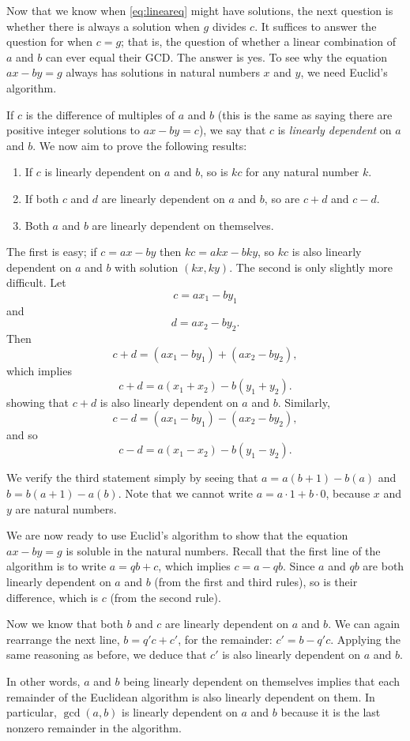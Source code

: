 \documentclass[a4paper,10pt]{article}
\begin{document}
Now that we know when \eqref{eq:lineareq} might have solutions, the next question is whether
there is always a solution when $g$ divides $c$. It suffices to answer the question for when $c=g$; that is, the question of whether a linear combination of $a$ and $b$
can ever equal their GCD. The answer is yes. To see why the equation $ax-by=g$ always has solutions
in natural numbers $x$ and $y$, we need Euclid's algorithm.

If $c$ is the difference of multiples of $a$ and $b$ (this is the same
as saying there are positive integer solutions to $ax-by=c$), we say that $c$
is \emph{linearly dependent} on $a$ and $b$. We now aim to prove the following results:
\begin{enumerate}
\item If $c$ is linearly dependent on $a$ and $b$, so is $kc$ for any natural number $k$.
\item If both $c$ and $d$ are linearly dependent on $a$ and $b$, so are $c+d$ and $c-d$.
\item Both $a$ and $b$ are linearly dependent on themselves.
\end{enumerate}
The first is easy; if $c=ax-by$ then $kc=akx-bky$, so $kc$ is also linearly dependent
on $a$ and $b$ with solution $(kx,ky)$. The second is only slightly more difficult. 
Let \[c=ax_1-by_1\] and \[d=ax_2-by_2.\] Then \[c+ d=(ax_1-by_1)+ (ax_2-by_2),\]
which implies \[c+d=a(x_1+x_2)-b(y_1+y_2).\] showing that $c+d$ is also linearly dependent
on $a$ and $b$. Similarly, \[c-d=(ax_1-by_1)-(ax_2-by_2), \] and so \[c-d=a(x_1-x_2)-b(y_1-y_2).\]

We verify the third statement simply by seeing that $a=a(b+1)-b(a)$ and $b=b(a+1)-a(b)$. 
Note that we cannot write $a=a\cdot1+b\cdot0$, because $x$ and $y$
are natural numbers.

We are now ready to use Euclid's algorithm to show that the equation $ax-by=g$ is soluble
in the natural numbers.
Recall that the first line of the algorithm is to write $a=qb+c$, which implies $c=a-qb.$
Since $a$ and $qb$ are both linearly dependent on $a$ and $b$ (from the first and third rules), so
is their difference, which is $c$ (from the second rule). 

Now we know that both $b$ and $c$ are linearly dependent
on $a$ and $b$. We can again rearrange the next line, $b=q'c+c'$, for the remainder: $c'=b-q'c$.
Applying the same reasoning as before, we deduce that $c'$ is also linearly dependent on $a$ and $b$.

In other words, $a$ and $b$ being linearly dependent on themselves implies that each remainder
of the Euclidean algorithm is also linearly dependent on them. In particular, $\gcd(a,b)$ is linearly
dependent on $a$ and $b$ because it is the last nonzero remainder in the algorithm.
\end{document}
